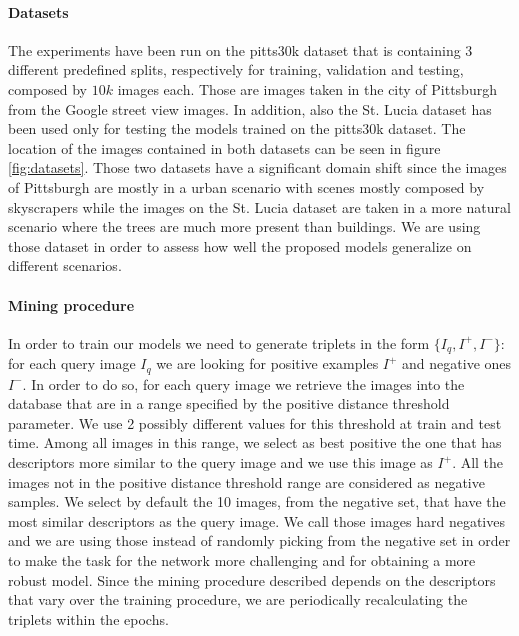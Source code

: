 \documentclass[10pt,twocolumn,letterpaper]{article}
\begin{document}
\paragraph{Datasets}
The experiments have been run on the pitts30k dataset \cite{NETVLAD} that is containing 3 different predefined splits, respectively for 
training, validation and testing, composed by $10k$ images each. Those are images taken in the city of Pittsburgh from the Google street
view images. In addition, also the St. Lucia dataset \cite{st_lucia} has been used only for testing the models trained on the pitts30k dataset.
The location of the images contained in both datasets can be seen in figure \ref{fig:datasets}. Those two datasets have a significant domain shift
since the images of Pittsburgh are mostly in a urban scenario with scenes mostly composed by skyscrapers while the images on the St. Lucia dataset 
are taken in a more natural scenario where the trees are much more present than buildings. We are using those dataset in order to assess how well
the proposed models generalize on different scenarios.

\paragraph{Mining procedure}\label{par:mining}
In order to train our models we need to generate triplets in the form $\{I_q, I^+, I^-\}$: for each query image $I_q$ we are looking for
positive examples $I^+$ and negative ones $I^-$. In order to do so, for each query image we retrieve the images into the database that are
in a range specified by the positive distance threshold parameter. We use 2 possibly different values for this threshold at train and test time.
Among all images in this range, we select as best positive the one that has descriptors more similar to the query image and we use this image
as $I^+$. All the images not in the positive distance threshold range are considered as negative samples. We select by default the 10 
images, from the negative set, that have the most similar descriptors as the query image. We call those images hard negatives and
we are using those instead of randomly picking from the negative set in order to make the task for the network more challenging and for obtaining  
a more robust model. Since the mining procedure described depends on the descriptors that vary over the training procedure, we are periodically recalculating the 
triplets within the epochs.
\end{document}
